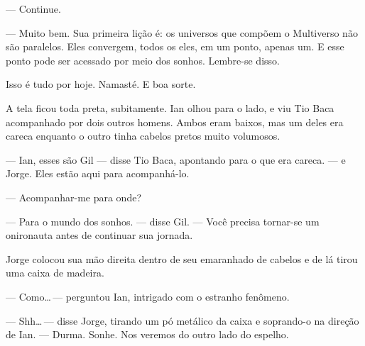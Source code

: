 --- Continue.

--- Muito bem. Sua primeira lição é: os universos que compõem o
Multiverso não são paralelos. Eles convergem, todos os eles, em um
ponto, apenas um. E esse ponto pode ser acessado por meio dos sonhos.
Lembre-se disso.

Isso é tudo por hoje. Namasté. E boa sorte.

A tela ficou toda preta, subitamente. Ian olhou para o lado, e viu Tio
Baca acompanhado por dois outros homens. Ambos eram baixos, mas um deles
era careca enquanto o outro tinha cabelos pretos muito volumosos.

--- Ian, esses são Gil --- disse Tio Baca, apontando para o que era
careca. --- e Jorge. Eles estão aqui para acompanhá-lo.

--- Acompanhar-me para onde?

--- Para o mundo dos sonhos. --- disse Gil. --- Você precisa tornar-se
um onironauta antes de continuar sua jornada.

Jorge colocou sua mão direita dentro de seu emaranhado de cabelos e de
lá tirou uma caixa de madeira.

--- Como\ldots\,--- perguntou Ian, intrigado com o estranho fenômeno.

--- Shh\ldots\,--- disse Jorge, tirando um pó metálico da caixa e
soprando-o na direção de Ian. --- Durma. Sonhe. Nos veremos do outro
lado do espelho.
